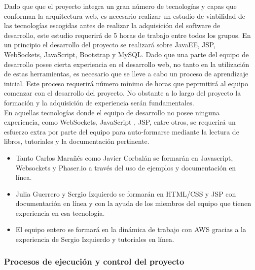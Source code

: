 Dado que que el proyecto integra un gran número de tecnologías y capas que conforman la arquitectura web, es necesario realizar un estudio de viabilidad de las tecnologías escogidas antes de realizar la adquisición del software de desarrollo, este estudio requerirá de 5 horas de trabajo entre todos los grupos.  En un principio el desarrollo del proyecto se realizará sobre JavaEE, JSP, WebSockets, JavaScript, Bootstrap y MySQL. Dado que una parte del equipo de desarrollo posee cierta experiencia en el desarrollo web, no tanto en la utilización de estas herramientas, es necesario que se lleve a cabo un proceso de aprendizaje inicial. Este proceso requerirá número mínimo de horas que peprmitirá al equipo comenzar con el desarrollo del proyecto. No obstante a lo largo del proyecto la formación y la adquisición de experiencia serán fundamentales.\\
En aquellas tecnologías donde el equipo de desarrollo no posee ninguna experiencia, como WebSockets, JavaScript , JSP,  entre otros, se requerirá un esfuerzo extra por parte del equipo para auto-formarse mediante la lectura de libros, tutoriales y la documentación pertinente.
\begin{itemize}
	\item Tanto Carlos Marañés como Javier Corbalán se formarán en Javascript, Websockets y Phaser.io a través del uso de ejemplos y documentación en línea.
	\item Julia Guerrero y Sergio Izquierdo se formarán en HTML/CSS y JSP con documentación en línea y  con la ayuda de los miembros del equipo que tienen experiencia en esa tecnología.
    \item El equipo entero se formará en la dinámica de trabajo con AWS gracias a la experiencia de Sergio Izquierdo y tutoriales en línea.
\end{itemize}

\subsubsection{Procesos de ejecución y control del proyecto}

